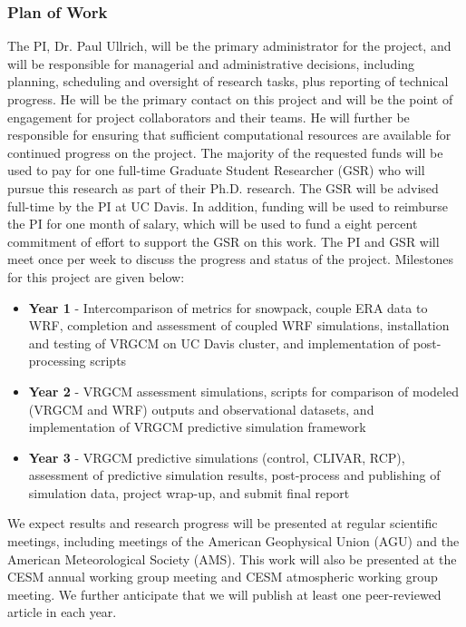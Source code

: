 \documentclass[11pt]{article}
\begin{document}
\subsubsection{Plan of Work}
The PI, Dr. Paul Ullrich, will be the primary administrator for the project, and will be responsible for managerial and administrative decisions, including planning, scheduling and oversight of research tasks, plus reporting of technical progress. He will be the primary contact on this project and will be the point of engagement for project collaborators and their teams. He will further be responsible for ensuring that sufficient computational resources are available for continued progress on the project. The majority of the requested funds will be used to pay for one full-time Graduate Student Researcher (GSR) who will pursue this research as part of their Ph.D. research. The GSR will be advised full-time by the PI at UC Davis. In addition, funding will be used to reimburse the PI for one month of salary, which will be used to fund a eight percent commitment of effort to support the GSR on this work. The PI and GSR will meet once per week to discuss the progress and status of the project. Milestones for this project are given below:

\begin{itemize}
  \item \textbf{Year 1} - Intercomparison of metrics for snowpack, couple ERA data to WRF, completion and assessment of coupled WRF simulations, installation and testing of VRGCM on UC Davis cluster, and implementation of post-processing scripts
  \item \textbf{Year 2} - VRGCM assessment simulations, scripts for comparison of modeled (VRGCM and WRF) outputs and observational datasets, and implementation of VRGCM predictive simulation framework
  \item \textbf{Year 3} - VRGCM predictive simulations (control, CLIVAR, RCP), assessment of predictive simulation results, post-process and publishing of simulation data, project wrap-up, and submit final report
\end{itemize}

We expect results and research progress will be presented at regular scientific meetings, including meetings of the American Geophysical Union (AGU) and the American Meteorological Society (AMS). This work will also be presented at the CESM annual working group meeting and CESM atmospheric working group meeting. We further anticipate that we will publish at least one peer-reviewed article in each year.
\end{document}
